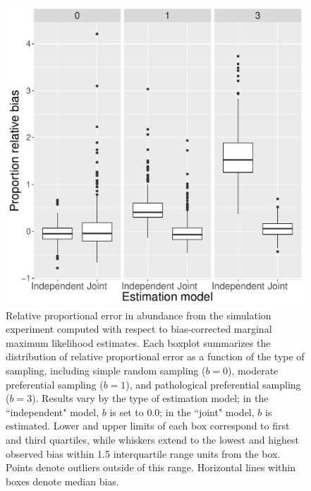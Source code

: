 \documentclass[times,mee,doublespace,]{besauth2}
\begin{document}
\begin{figure} %
\begin{center}
\includegraphics[width=170mm]{bias.pdf}
\caption{Relative proportional error in abundance from the simulation experiment computed with respect to bias-corrected marginal maximum likelihood estimates. Each boxplot summarizes the distribution of relative proportional error as a function of the type of sampling, including simple random sampling ($b=0$), moderate preferential sampling ($b=1$), and pathological preferential sampling ($b=3$). Results vary by the type of estimation model; in the ``independent" model, $b$ is set to 0.0; in the ``joint" model, $b$ is estimated.  Lower and upper limits of each box correspond to first and third quartiles, while whiskers extend to the lowest and highest observed bias within 1.5 interquartile range units from the box.  Points denote outliers outside of this range.  Horizontal lines within boxes denote median bias.  }
\label{fig:sim_bias}
\end{center}
\end{figure}
\end{document}
